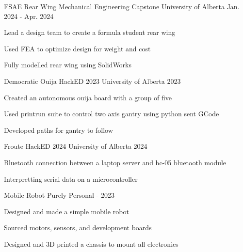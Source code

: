 \begin{cventries}
\cventry
{FSAE Rear Wing} %
{Mechanical Engineering Capstone} %
{University of Alberta} %
{Jan. 2024 - Apr. 2024} %
{
  \begin{cvitems} %
    \item Lead a design team to create a formula student rear wing
    \item Used FEA to optimize design for weight and cost
    \item Fully modelled rear wing using SolidWorks 
  \end{cvitems}
}

\cventry
{Democratic Ouija} %
{HackED 2023} %
{University of Alberta} %
{2023} %
{
  \begin{cvitems} %
    \item Created an autonomous ouija board with a group of five
    \item Used printrun suite to control two axis gantry using python sent GCode
    \item Developed paths for gantry to follow
  \end{cvitems}
}


\cventry
{Froute} %
{HackED 2024} %
{University of Alberta} %
{2024} %
{
  \begin{cvitems} %
    \item Bluetooth connection between a laptop server and hc-05 bluetooth module
    \item Interpretting serial data on a microcontroller
  \end{cvitems}
}

\cventry
{Mobile Robot} %
{Purely Personal} %
{-} %
{2023} %
{
  \begin{cvitems} %
    \item Designed and made a simple mobile robot
    \item Sourced motors, sensors, and development boards
    \item Designed and 3D printed a chassis to mount all electronics
  \end{cvitems}
}


\end{cventries}
